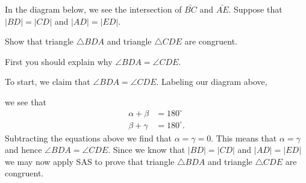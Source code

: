 \documentclass[nooutcomes,noauthor,hints]{ximera}
\begin{document}
\begin{question}
  In the diagram below, we see the intersection of $\bar{BC}$ and
  $\bar{AE}$. Suppose that $\left\vert BD\right\vert =\left\vert
  CD\right\vert $ and $\left\vert AD\right\vert =\left\vert
  ED\right\vert $.
  \begin{center}
  \end{center}
  Show that triangle $\triangle BDA$ and triangle $\triangle CDE$ are
  congruent.
  
  \begin{hint}
    First you should explain why $\angle BDA = \angle CDE$.
  \end{hint}
  \begin{freeResponse}
    To start, we claim that $\angle BDA = \angle CDE$. Labeling our
    diagram above,
    \begin{center}
    \end{center}
    we see that 
    \begin{align*}
      \alpha+\beta &= 180^\circ\\
      \beta + \gamma &= 180^\circ.
\end{align*}
Subtracting the equations above we find that $\alpha=\gamma = 0$.
This means that $\alpha = \gamma$ and hence $\angle BDA = \angle
CDE$. Since we know that $\left\vert BD\right\vert =\left\vert
CD\right\vert $ and $\left\vert AD\right\vert =\left\vert
ED\right\vert $ we may now apply SAS to prove that triangle $\triangle
BDA$ and triangle $\triangle CDE$ are congruent.
\end{freeResponse}
\end{question}
\end{document}
